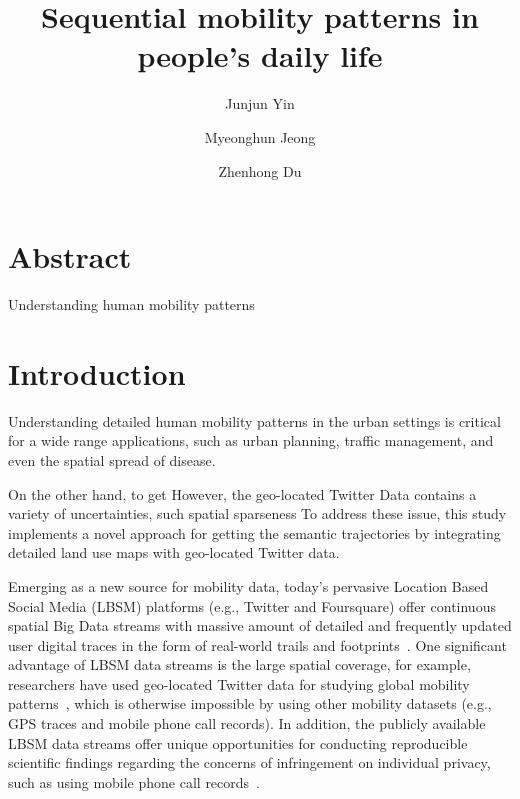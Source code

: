 \documentclass[a4paper,11pt]{article}
\begin{document}
\title{Sequential mobility patterns in people's daily life}
\author[1,*]{Junjun Yin}
\author[1,2,*]{Myeonghun Jeong}
\author[3]{Zhenhong Du}
\renewcommand\Authands{ and }
\maketitle

\section*{\centering Abstract}
Understanding human mobility patterns 


\section*{Introduction}
Understanding detailed human mobility patterns in the urban settings is critical for a wide range applications, such as urban planning, traffic management, and even the spatial spread of disease.

On the other hand, to get 
However, the geo-located Twitter Data contains a variety of uncertainties, such spatial sparseness
To address these issue, this study implements a novel approach for getting the semantic trajectories by integrating detailed land use maps with geo-located Twitter data.

Emerging as a new source for mobility data, today's pervasive Location Based Social Media (LBSM) platforms (e.g., Twitter and Foursquare) offer continuous spatial Big Data streams with massive amount of detailed and frequently updated user digital traces in the form of real-world trails and footprints~\cite{thatcher2014}.
One significant advantage of LBSM data streams is the large spatial coverage, for example, researchers have used geo-located Twitter data for studying global mobility patterns~\cite{hawelka2014geo}, which is otherwise impossible by using other mobility datasets (e.g., GPS traces and mobile phone call records). 
In addition, the publicly available LBSM data streams offer unique opportunities for conducting reproducible scientific findings regarding the concerns of infringement on individual privacy, such as using mobile phone call records~\cite{giannotti2008mobility,crampton2014collect,Jurdak2015}.
\end{document}
